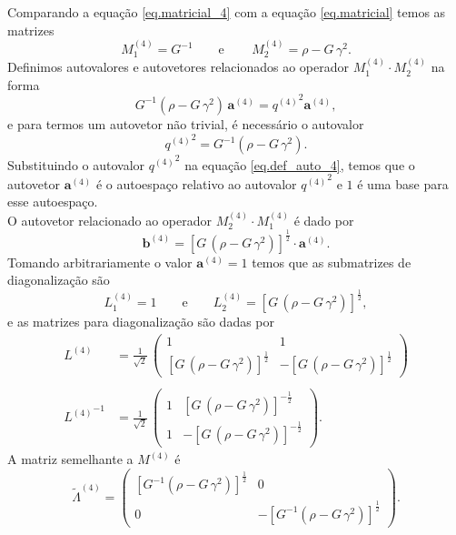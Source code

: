 Comparando a equa\c{c}\~ao \ref{eq.matricial_4} com a equa\c{c}\~ao \ref{eq.matricial} temos as matrizes
\begin{equation*}
M^{(4)}_1=G^{-1}\qquad\text{e}\qquad\,M^{(4)}_2=\rho-G\,\gamma^2.
\end{equation*}
Definimos autovalores e autovetores relacionados ao operador $M^{(4)}_1\cdot M^{(4)}_2$ na forma
\begin{equation}\label{eq.def_auto_4}
G^{-1}(\rho-G\,\gamma^2)\,\mathbf{a}^{(4)}={q^{(4)}}^2\mathbf{a}^{(4)},
\end{equation}
e para termos um autovetor n\~ao trivial, \'e necess\'ario o autovalor
\begin{equation*}
{q^{(4)}}^2=G^{-1}(\rho-G\,\gamma^2).
\end{equation*}
Substituindo o autovalor ${q^{(4)}}^2$ na equa\c{c}\~ao \ref{eq.def_auto_4}, temos que o autovetor $\mathbf{a}^{(4)}$ \'e o autoespa\c{c}o relativo ao autovalor ${q^{(4)}}^2$ e ${1}$ \'e uma base para esse autoespa\c{c}o.\\
O autovetor relacionado ao operador $M^{(4)}_2\cdot M^{(4)}_1$ \'e dado por
\begin{equation*}
\mathbf{b}^{(4)}=[G\,(\rho-G\,\gamma^2)]^{\frac{1}{2}}   \cdot\mathbf{a}^{(4)}.
\end{equation*}
Tomando arbitrariamente o valor $\mathbf{a}^{(4)}=1$ temos que as submatrizes de diagonaliza\c{c}\~ao s\~ao
\begin{equation*}
L^{(4)}_1=1\qquad\text{e}\qquad L^{(4)}_2=[G\,(\rho-G\,\gamma^2)]^{\frac{1}{2}},
\end{equation*}
e as matrizes para diagonaliza\c{c}\~ao s\~ao dadas por
\begin{align*}
L^{(4)}&=\frac{1}{\sqrt{2}}\,
\begin{pmatrix}
1&1\\
[G\,(\rho-G\,\gamma^2)]^{\frac{1}{2}}&-[G\,(\rho-G\,\gamma^2)]^{\frac{1}{2}}
\end{pmatrix}\\\\
{L^{(4)}}^{-1}&=\frac{1}{\sqrt{2}}\,
\begin{pmatrix}
1&[G\,(\rho-G\,\gamma^2)]^{-\frac{1}{2}}\\
1&-[G\,(\rho-G\,\gamma^2)]^{-\frac{1}{2}}
\end{pmatrix}.
\end{align*}
A matriz semelhante a $M^{(4)}$ \'e
\begin{equation*}
\tilde{\Lambda}^{(4)}=
\begin{pmatrix}
[G^{-1}(\rho-G\,\gamma^2)]^{\frac{1}{2}}&0\\
0&-[G^{-1}(\rho-G\,\gamma^2)]^{\frac{1}{2}}
\end{pmatrix}.
\end{equation*}





